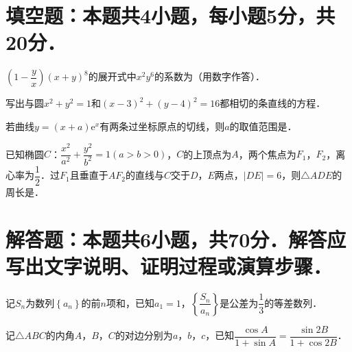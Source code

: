 \documentclass[11pt,addpoints,answers]{exam}
\begin{document}
\begin{multicols}{3}
\begin{questions}
        \section{填空题：本题共4小题，每小题5分，共20分．}

        \question
        $\left(1-\dfrac{y}{x}\right)\left(x+y\right)^{8}$的展开式中$x^{2}y^{6}$的系数为\fillin （用数字作答）．

        \question
        写出与圆$x^2+y^2=1$和$\left(x-3\right)^2+\left(y-4\right)^2=16$都相切的条直线的方程\fillin ．

        \question
        若曲线$y=\left(x+a\right)\mathrm{e}^x$有两条过坐标原点的切线，则$a$的取值范围是\fillin ．

        \question
        已知椭圆$C$：$\dfrac{x^2}{a^2}+\dfrac{y^2}{b^2}=1\left(a>b>0\right)$，$C$的上顶点为$A$，两个焦点为$F_1$，$F_2$，离心率为$\dfrac{1}{2}$．过$F_1$且垂直于$AF_2$的直线与$C$交于$D$，$E$两点，$\left|DE\right|=6$，则$\triangle ADE$的周长是\fillin ．


        \section{解答题：本题共6小题，共70分．解答应写出文字说明、证明过程或演算步骤．}

        \question[10]
        记$S_n$为数列$\left\{a_n\right\}$的前$n$项和，已知$a_1=1$，$\left\{\dfrac{S_n}{a_n}\right\}$是公差为$\dfrac{1}{3}$的等差数列．
        \fillwithdottedlines{3.1in}

        \question[12]
        记$\triangle ABC$的内角$A$，$B$，$C$的对边分别为$a$，$b$，$c$，已知$\dfrac{\cos A}{1+\sin A}=\dfrac{\sin 2B}{1+\cos 2B}$．
        \fillwithdottedlines{3.1in}


\end{questions}
\end{multicols}
\end{document}
